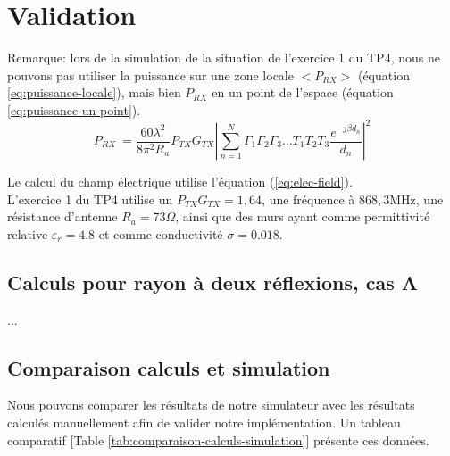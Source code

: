 \chapter{Validation}
\label{chaper-3}





Remarque: lors de la simulation de la situation de l'exercice 1 du TP4, nous ne pouvons pas utiliser la puissance sur une zone locale $<P_{RX}>$ (équation \ref{eq:puissance-locale}), mais bien $P_{RX}$ en un point de l'espace (équation \ref{eq:puissance-un-point}).
\begin{equation}
    \label{eq:puissance-un-point}
    P_{RX}\ = \frac{60 \lambda^2}{8 \pi^2 R_a}P_{TX}G_{TX} \left| \sum_{n=1}^N \Gamma_1 \Gamma_2 \Gamma_3 \dotsc T_1 T_2 T_3 \frac{e^{-j \beta d_n}}{d_n} \right|^2
\end{equation}

Le calcul du champ électrique utilise l'équation (\ref{eq:elec-field}).\\

L'exercice 1 du TP4 utilise un $P_{TX}G_{TX}=1,64$, une fréquence à $868,3 \mathrm{MHz}$, une résistance d'antenne $R_a=73 \Omega$, ainsi que des murs ayant comme permittivité relative $\varepsilon_r=4.8$ et comme conductivité $\sigma=0.018$.

\section{Calculs pour rayon à deux réflexions, cas A}
...

\section{Comparaison calculs et simulation}
Nous pouvons comparer les résultats de notre simulateur avec les résultats calculés manuellement afin de valider notre implémentation. Un tableau comparatif [Table \ref{tab:comparaison-calculs-simulation}] présente ces données.

